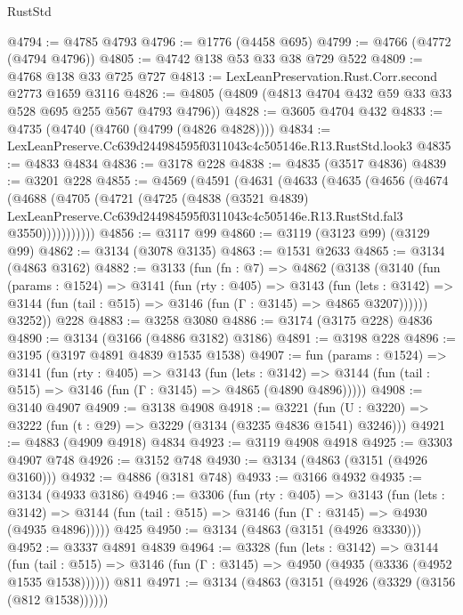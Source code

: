 \begin{lexlean}{RustStd}
\begin{coremodule}
@4794 := @4785 @4793
@4796 := @1776 (@4458 @695)
@4799 := @4766 (@4772 (@4794 @4796))
@4805 := @4742 @138 @53 @33 @38 @729 @522
@4809 := @4768 @138 @33 @725 @727
@4813 := LexLeanPreservation.Rust.Corr.second @2773 @1659 @3116
@4826 := @4805 (@4809 (@4813 @4704 @432 @59 @33 @33 @528 @695 @255 @567 @4793 @4796))
@4828 := @3605 @4704 @432
@4833 := @4735 (@4740 (@4760 (@4799 (@4826 @4828))))
@4834 := LexLeanPreserve.Cc639d244984595f0311043c4c505146e.R13.RustStd.look3
@4835 := @4833 @4834
@4836 := @3178 @228
@4838 := @4835 (@3517 @4836)
@4839 := @3201 @228
@4855 := @4569
    (@4591
      (@4631
        (@4633
          (@4635
            (@4656
              (@4674
                (@4688
                  (@4705
                    (@4721
                      (@4725
                        (@4838
                          (@3521 @4839)
                          LexLeanPreserve.Cc639d244984595f0311043c4c505146e.R13.RustStd.fal3
                          @3550)))))))))))
@4856 := @3117 @99
@4860 := @3119 (@3123 @99) (@3129 @99)
@4862 := @3134 (@3078 @3135)
@4863 := @1531 @2633
@4865 := @3134 (@4863 @3162)
@4882 := @3133
    (fun (fn : @7) =>
    @4862
      (@3138
        (@3140
          (fun (params : @1524) =>
          @3141
            (fun (rty : @405) =>
            @3143
              (fun (lets : @3142) =>
              @3144 (fun (tail : @515) => @3146 (fun (Γ : @3145) => @4865 @3207))))))
        @3252))
    @228
@4883 := @3258 @3080
@4886 := @3174 (@3175 @228) @4836
@4890 := @3134 (@3166 (@4886 @3182) @3186)
@4891 := @3198 @228
@4896 := @3195 (@3197 @4891 @4839 @1535 @1538)
@4907 := fun (params : @1524) =>
  @3141
    (fun (rty : @405) =>
    @3143
      (fun (lets : @3142) =>
      @3144 (fun (tail : @515) => @3146 (fun (Γ : @3145) => @4865 (@4890 @4896)))))
@4908 := @3140 @4907
@4909 := @3138 @4908
@4918 := @3221 (fun (U : @3220) => @3222 (fun (t : @29) => @3229 (@3134 (@3235 @4836 @1541) @3246)))
@4921 := @4883 (@4909 @4918) @4834
@4923 := @3119 @4908 @4918
@4925 := @3303 @4907 @748
@4926 := @3152 @748
@4930 := @3134 (@4863 (@3151 (@4926 @3160)))
@4932 := @4886 (@3181 @748)
@4933 := @3166 @4932
@4935 := @3134 (@4933 @3186)
@4946 := @3306
    (fun (rty : @405) =>
    @3143
      (fun (lets : @3142) =>
      @3144 (fun (tail : @515) => @3146 (fun (Γ : @3145) => @4930 (@4935 @4896)))))
    @425
@4950 := @3134 (@4863 (@3151 (@4926 @3330)))
@4952 := @3337 @4891 @4839
@4964 := @3328
    (fun (lets : @3142) =>
    @3144
      (fun (tail : @515) => @3146 (fun (Γ : @3145) => @4950 (@4935 (@3336 (@4952 @1535 @1538))))))
    @811
@4971 := @3134 (@4863 (@3151 (@4926 (@3329 (@3156 (@812 @1538))))))

\end{coremodule}
\end{lexlean}
